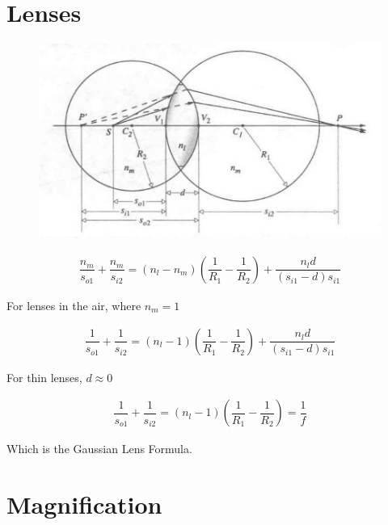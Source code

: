 \section{Lenses}

\begin{figure}[H]
  \centering
  \includegraphics[width=0.5\linewidth]{figures/Thin-Lens.jpg}
  \label{fig:}
\end{figure}

\begin{equation*}
  \begin{aligned}
    \dfrac{n_m}{s_{o1}} + \dfrac{n_m}{s_{i2}} = \left( n_l - n_m \right) \left( \dfrac{1}{R_1} - \dfrac{1}{R_2}   \right) + \dfrac{n_l d}{\left( s_{i1} - d \right) s_{i1}} 
  \end{aligned}
\end{equation*}

For lenses in the air, where $n_m = 1$

\begin{equation*}
  \begin{aligned}
    \dfrac{1}{s_{o1}} + \dfrac{1}{s_{i2}} = \left( n_l - 1 \right) \left( \dfrac{1}{R_1} - \dfrac{1}{R_2}   \right) + \dfrac{n_l d}{\left( s_{i1} - d \right) s_{i1}} 
  \end{aligned}
\end{equation*}

For thin lenses, $d \approx 0$

\begin{equation*}
  \begin{aligned}
    \dfrac{1}{s_{o1}} + \dfrac{1}{s_{i2}} = \left( n_l - 1 \right) \left( \dfrac{1}{R_1} - \dfrac{1}{R_2}   \right) = \dfrac{1}{f} 
  \end{aligned}
\end{equation*}

Which is the Gaussian Lens Formula.

\section{Magnification}

